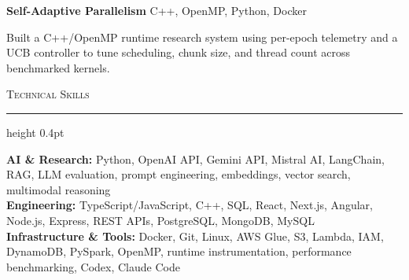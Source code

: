 \documentclass[letterpaper,11pt]{article}
\newcommand{\resumesection}[1]{%
  \par\vspace{2pt}%
  {\large\scshape #1}\par\vspace{2pt}%
  \hrule height 0.4pt\vspace{2pt}%
}
\newcommand{\projectHeading}[2]{
  \textbf{#1} \hfill #2
}
\begin{document}
\projectHeading{Self-Adaptive Parallelism}{C++, OpenMP, Python, Docker}
\begin{tightitemize}
  \item Built a C++/OpenMP runtime research system using per-epoch telemetry and a UCB controller to tune scheduling, chunk size, and thread count across benchmarked kernels.
\end{tightitemize}

\resumesection{Technical Skills}
\textbf{AI \& Research:} Python, OpenAI API, Gemini API, Mistral AI, LangChain, RAG, LLM evaluation, prompt engineering, embeddings, vector search, multimodal reasoning\\
\textbf{Engineering:} TypeScript/JavaScript, C++, SQL, React, Next.js, Angular, Node.js, Express, REST APIs, PostgreSQL, MongoDB, MySQL\\
\textbf{Infrastructure \& Tools:} Docker, Git, Linux, AWS Glue, S3, Lambda, IAM, DynamoDB, PySpark, OpenMP, runtime instrumentation, performance benchmarking, Codex, Claude Code
\end{document}
